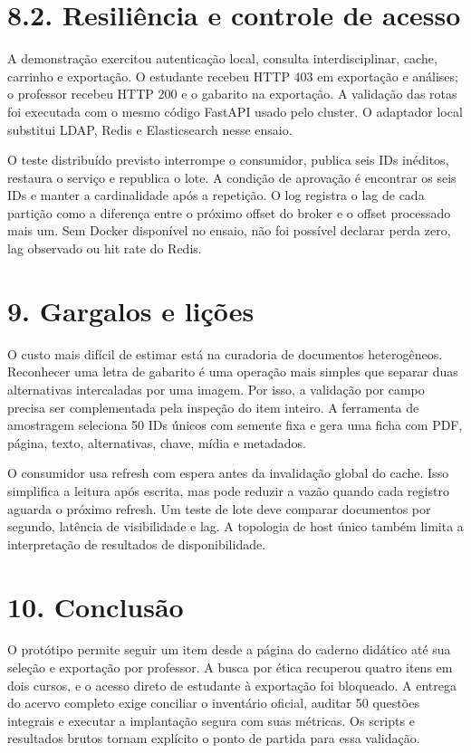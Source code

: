 \documentclass[12pt,a4paper]{article}
\begin{document}
\section*{8.2. Resiliência e controle de acesso}
A demonstração exercitou autenticação local, consulta interdisciplinar, cache, carrinho e exportação. O estudante recebeu HTTP 403 em exportação e análises; o professor recebeu HTTP 200 e o gabarito na exportação. A validação das rotas foi executada com o mesmo código FastAPI usado pelo cluster. O adaptador local substitui LDAP, Redis e Elasticsearch nesse ensaio.

O teste distribuído previsto interrompe o consumidor, publica seis IDs inéditos, restaura o serviço e republica o lote. A condição de aprovação é encontrar os seis IDs e manter a cardinalidade após a repetição. O log registra o lag de cada partição como a diferença entre o próximo offset do broker e o offset processado mais um. Sem Docker disponível no ensaio, não foi possível declarar perda zero, lag observado ou hit rate do Redis.

\clearpage
\section*{9. Gargalos e lições}
O custo mais difícil de estimar está na curadoria de documentos heterogêneos. Reconhecer uma letra de gabarito é uma operação mais simples que separar duas alternativas intercaladas por uma imagem. Por isso, a validação por campo precisa ser complementada pela inspeção do item inteiro. A ferramenta de amostragem seleciona 50 IDs únicos com semente fixa e gera uma ficha com PDF, página, texto, alternativas, chave, mídia e metadados.

O consumidor usa refresh com espera antes da invalidação global do cache. Isso simplifica a leitura após escrita, mas pode reduzir a vazão quando cada registro aguarda o próximo refresh. Um teste de lote deve comparar documentos por segundo, latência de visibilidade e lag. A topologia de host único também limita a interpretação de resultados de disponibilidade.

\section*{10. Conclusão}
O protótipo permite seguir um item desde a página do caderno didático até sua seleção e exportação por professor. A busca por ética recuperou quatro itens em dois cursos, e o acesso direto de estudante à exportação foi bloqueado. A entrega do acervo completo exige conciliar o inventário oficial, auditar 50 questões integrais e executar a implantação segura com suas métricas. Os scripts e resultados brutos tornam explícito o ponto de partida para essa validação.
\end{document}
